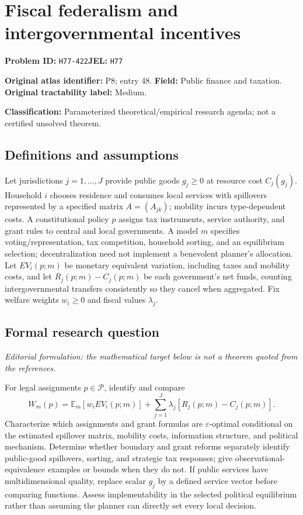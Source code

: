 \documentclass[11pt,a4paper]{article}
\begin{document}
\section*{Fiscal federalism and intergovernmental incentives}
\textbf{Problem ID:} \texttt{H77-422}\quad \textbf{JEL:} \texttt{H77}\par
\label{problem:OP-0048}
\label{atlas:prob:P8}
\noindent\textbf{Original atlas identifier:} P8; entry 48. \textbf{Field:} Public finance and taxation. \textbf{Original tractability label:} Medium.

\noindent\textbf{Classification:} Parameterized theoretical/empirical research agenda; not a certified unsolved theorem.

\subsection*{Definitions and assumptions}
Let jurisdictions $j=1,\ldots,J$ provide public goods $g_j\geq0$ at resource cost $C_j(g_j)$. Household $i$ chooses residence and consumes local services with spillovers represented by a specified matrix $A=(A_{jk})$; mobility incurs type-dependent costs. A constitutional policy $p$ assigns tax instruments, service authority, and grant rules to central and local governments. A model $m$ specifies voting/representation, tax competition, household sorting, and an equilibrium selection; decentralization need not implement a benevolent planner's allocation. Let $EV_i(p;m)$ be monetary equivalent variation, including taxes and mobility costs, and let $R_j(p;m)-C_j(p;m)$ be each government's net funds, counting intergovernmental transfers consistently so they cancel when aggregated. Fix welfare weights $w_i\geq0$ and fiscal values $\lambda_j$.

\subsection*{Formal research question}
\emph{Editorial formulation: the mathematical target below is not a theorem quoted from the references.}

For legal assignments $p\in\mathcal P$, identify and compare
\[
 W_m(p)=\mathbb E_m[w_iEV_i(p;m)]+\sum_{j=1}^{J}\lambda_j[R_j(p;m)-C_j(p;m)].
\]
Characterize which assignments and grant formulas are $\varepsilon$-optimal conditional on the estimated spillover matrix, mobility costs, information structure, and political mechanism. Determine whether boundary and grant reforms separately identify public-good spillovers, sorting, and strategic tax responses; give observational-equivalence examples or bounds when they do not. If public services have multidimensional quality, replace scalar $g_j$ by a defined service vector before comparing functions. Assess implementability in the selected political equilibrium rather than assuming the planner can directly set every local decision.
\end{document}
